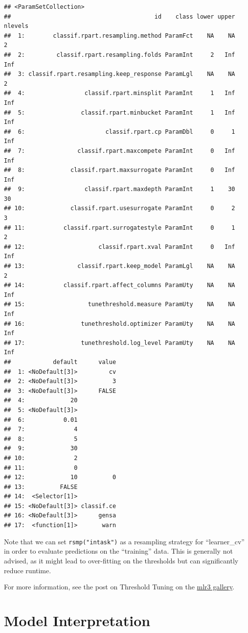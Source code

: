 \documentclass[
]{scrbook}
\begin{document}
\begin{verbatim}
## <ParamSetCollection>
##                                         id    class lower upper nlevels
##  1:        classif.rpart.resampling.method ParamFct    NA    NA       2
##  2:         classif.rpart.resampling.folds ParamInt     2   Inf     Inf
##  3: classif.rpart.resampling.keep_response ParamLgl    NA    NA       2
##  4:                 classif.rpart.minsplit ParamInt     1   Inf     Inf
##  5:                classif.rpart.minbucket ParamInt     1   Inf     Inf
##  6:                       classif.rpart.cp ParamDbl     0     1     Inf
##  7:               classif.rpart.maxcompete ParamInt     0   Inf     Inf
##  8:             classif.rpart.maxsurrogate ParamInt     0   Inf     Inf
##  9:                 classif.rpart.maxdepth ParamInt     1    30      30
## 10:             classif.rpart.usesurrogate ParamInt     0     2       3
## 11:           classif.rpart.surrogatestyle ParamInt     0     1       2
## 12:                     classif.rpart.xval ParamInt     0   Inf     Inf
## 13:               classif.rpart.keep_model ParamLgl    NA    NA       2
## 14:           classif.rpart.affect_columns ParamUty    NA    NA     Inf
## 15:                  tunethreshold.measure ParamUty    NA    NA     Inf
## 16:                tunethreshold.optimizer ParamUty    NA    NA     Inf
## 17:                tunethreshold.log_level ParamUty    NA    NA     Inf
##            default      value
##  1: <NoDefault[3]>         cv
##  2: <NoDefault[3]>          3
##  3: <NoDefault[3]>      FALSE
##  4:             20           
##  5: <NoDefault[3]>           
##  6:           0.01           
##  7:              4           
##  8:              5           
##  9:             30           
## 10:              2           
## 11:              0           
## 12:             10          0
## 13:          FALSE           
## 14:  <Selector[1]>           
## 15: <NoDefault[3]> classif.ce
## 16: <NoDefault[3]>      gensa
## 17:  <function[1]>       warn
\end{verbatim}

Note that we can set \texttt{rsmp("intask")} as a resampling strategy for ``learner\_cv'' in order to evaluate
predictions on the ``training'' data. This is generally not advised, as it might lead to over-fitting
on the thresholds but can significantly reduce runtime.

For more information, see the post on Threshold Tuning on the \href{https://mlr3gallery.mlr-org.com/}{mlr3 gallery}.

\hypertarget{interpretation}{%
\chapter{Model Interpretation}\label{interpretation}}
\end{document}
